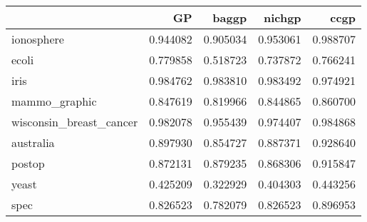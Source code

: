 \begin{tabular}{lrrrr}
\toprule
{} &        GP &     baggp &    nichgp &      ccgp \\
\midrule
ionosphere              &  0.944082 &  0.905034 &  0.953061 &  0.988707 \\
ecoli                   &  0.779858 &  0.518723 &  0.737872 &  0.766241 \\
iris                    &  0.984762 &  0.983810 &  0.983492 &  0.974921 \\
mammo\_graphic           &  0.847619 &  0.819966 &  0.844865 &  0.860700 \\
wisconsin\_breast\_cancer &  0.982078 &  0.955439 &  0.974407 &  0.984868 \\
australia               &  0.897930 &  0.854727 &  0.887371 &  0.928640 \\
postop                  &  0.872131 &  0.879235 &  0.868306 &  0.915847 \\
yeast                   &  0.425209 &  0.322929 &  0.404303 &  0.443256 \\
spec                    &  0.826523 &  0.782079 &  0.826523 &  0.896953 \\
\bottomrule
\end{tabular}
